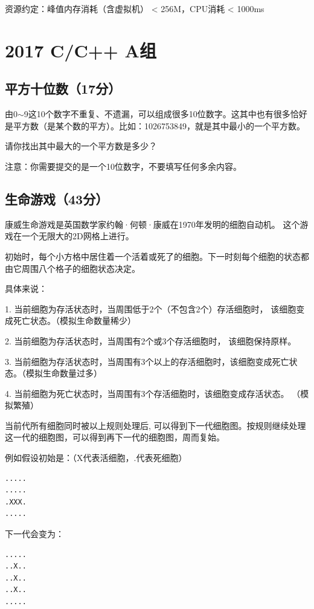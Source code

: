 \documentclass[a4paper, 12pt, twocolumn]{ctexart}
\begin{document}
	资源约定：峰值内存消耗（含虚拟机） < 256M，CPU消耗  < 1000ms
	
	\section{2017 C/C++ A组}
	
	
	\subsection{平方十位数（17分）}
	
	由0$\sim$9这10个数字不重复、不遗漏，可以组成很多10位数字。这其中也有很多恰好是平方数（是某个数的平方）。比如：1026753849，就是其中最小的一个平方数。
	
	请你找出其中最大的一个平方数是多少？
	
	注意：你需要提交的是一个10位数字，不要填写任何多余内容。
	
	
	\subsection{生命游戏（43分）}
	
	康威生命游戏是英国数学家约翰·何顿·康威在1970年发明的细胞自动机。 这个游戏在一个无限大的2D网格上进行。
	
	初始时，每个小方格中居住着一个活着或死了的细胞。下一时刻每个细胞的状态都由它周围八个格子的细胞状态决定。
	
	具体来说：
	
	1. 当前细胞为存活状态时，当周围低于2个（不包含2个）存活细胞时， 该细胞变成死亡状态。（模拟生命数量稀少）
	
	2. 当前细胞为存活状态时，当周围有2个或3个存活细胞时， 该细胞保持原样。
	
	3. 当前细胞为存活状态时，当周围有3个以上的存活细胞时，该细胞变成死亡状态。（模拟生命数量过多）
	
	4. 当前细胞为死亡状态时，当周围有3个存活细胞时，该细胞变成存活状态。 （模拟繁殖）
	
	当前代所有细胞同时被以上规则处理后, 可以得到下一代细胞图。按规则继续处理这一代的细胞图，可以得到再下一代的细胞图，周而复始。
	
	例如假设初始是：（X代表活细胞，.代表死细胞）
	
	\begin{lstlisting}
.....
.....
.XXX.
.....
	\end{lstlisting}

	
	下一代会变为：
	\begin{lstlisting}	
.....
..X..
..X..
..X..
.....
	\end{lstlisting}
	
\end{document}
